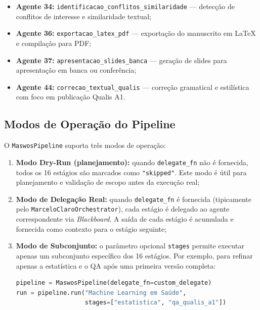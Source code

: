 \begin{itemize}
    \item \textbf{Agente 34:}
    \texttt{identificacao\_conflitos\_similaridade} — detecção de
    conflitos de interesse e similaridade textual;

    \item \textbf{Agente 36:}
    \texttt{exportacao\_latex\_pdf} — exportação do manuscrito em
    LaTeX e compilação para PDF;

    \item \textbf{Agente 37:}
    \texttt{apresentacao\_slides\_banca} — geração de slides para
    apresentação em banca ou conferência;

    \item \textbf{Agente 44:}
    \texttt{correcao\_textual\_qualis} — correção gramatical e
    estilística com foco em publicação Qualis A1.
\end{itemize}

\subsection{Modos de Operação do Pipeline}
\label{sec:modos_operacao}

O \texttt{MaswosPipeline} suporta três modos de operação:

\begin{enumerate}
    \item \textbf{Modo Dry-Run (planejamento):} quando
    \texttt{delegate\_fn} não é fornecida, todos os 16 estágios são
    marcados como \texttt{"skipped"}. Este modo é útil para
    planejamento e validação de escopo antes da execução real;

    \item \textbf{Modo de Delegação Real:} quando
    \texttt{delegate\_fn} é fornecida (tipicamente pelo
    \texttt{MarceloClaroOrchestrator}), cada estágio é delegado ao
    agente correspondente via \textit{Blackboard}. A saída de cada
    estágio é acumulada e fornecida como contexto para o estágio
    seguinte;

    \item \textbf{Modo de Subconjunto:} o parâmetro opcional
    \texttt{stages} permite executar apenas um subconjunto
    específico dos 16 estágios. Por exemplo, para refinar apenas a
    estatística e o QA após uma primeira versão completa:

\begin{lstlisting}[language=Python, caption={Execução de subconjunto de estágios}, label={lst:subset}]
pipeline = MaswosPipeline(delegate_fn=custom_delegate)
run = pipeline.run("Machine Learning em Saúde",
                   stages=["estatistica", "qa_qualis_a1"])
\end{lstlisting}
\end{enumerate}

